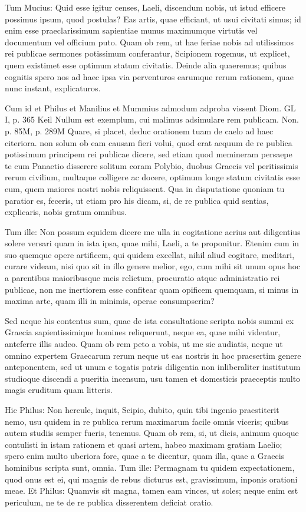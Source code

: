  Tum Mucius: Quid esse igitur censes, Laeli, discendum nobis, ut istud efficere possimus ipsum, quod postulas? Eas artis, quae efficiant, ut usui civitati simus; id enim esse praeclarissimum sapientiae munus maximumque virtutis vel documentum vel officium puto. Quam ob rem, ut hae feriae nobis ad utilissimos rei publicae sermones potissimum conferantur, Scipionem rogemus, ut explicet, quem existimet esse optimum statum civitatis. Deinde alia quaeremus; quibus cognitis spero nos ad haec ipsa via perventuros earumque rerum rationem, quae nunc instant, explicaturos.

 Cum id et Philus et Manilius et Mummius admodum adproba vissent Diom. GL I, p. 365 Keil Nullum est exemplum, cui malimus adsimulare rem publicam. Non. p. 85M, p. 289M Quare, si placet, deduc orationem tuam de caelo ad haec citeriora. non solum ob eam causam fieri volui, quod erat aequum de re publica potissimum principem rei publicae dicere, sed etiam quod memineram persaepe te cum Panaetio disserere solitum coram Polybio, duobus Graecis vel peritissimis rerum civilium, multaque colligere ac docere, optimum longe statum civitatis esse eum, quem maiores nostri nobis reliquissent. Qua in disputatione quoniam tu paratior es, feceris, ut etiam pro his dicam, si, de re publica quid sentias, explicaris, nobis gratum omnibus.

 Tum ille: Non possum equidem dicere me ulla in cogitatione acrius aut diligentius solere versari quam in ista ipsa, quae mihi, Laeli, a te proponitur. Etenim cum in suo quemque opere artificem, qui quidem excellat, nihil aliud cogitare, meditari, curare videam, nisi quo sit in illo genere melior, ego, cum mihi sit unum opus hoc a parentibus maioribusque meis relictum, procuratio atque administratio rei publicae, non me inertiorem esse confitear quam opificem quemquam, si minus in maxima arte, quam illi in minimis, operae consumpserim?

 Sed neque his contentus sum, quae de ista consultatione scripta nobis summi ex Graecia sapientissimique homines reliquerunt, neque ea, quae mihi videntur, anteferre illis audeo. Quam ob rem peto a vobis, ut me sic audiatis, neque ut omnino expertem Graecarum rerum neque ut eas nostris in hoc praesertim genere anteponentem, sed ut unum e togatis patris diligentia non inliberaliter institutum studioque discendi a pueritia incensum, usu tamen et domesticis praeceptis multo magis eruditum quam litteris.

 Hic Philus: Non hercule, inquit, Scipio, dubito, quin tibi ingenio praestiterit nemo, usu quidem in re publica rerum maximarum facile omnis viceris; quibus autem studiis semper fueris, tenemus. Quam ob rem, si, ut dicis, animum quoque contulisti in istam rationem et quasi artem, habeo maximam gratiam Laelio; spero enim multo uberiora fore, quae a te dicentur, quam illa, quae a Graecis hominibus scripta sunt, omnia. Tum ille: Permagnam tu quidem expectationem, quod onus est ei, qui magnis de rebus dicturus est, gravissimum, inponis orationi meae. Et Philus: Quamvis sit magna, tamen eam vinces, ut soles; neque enim est periculum, ne te de re publica disserentem deficiat oratio.

